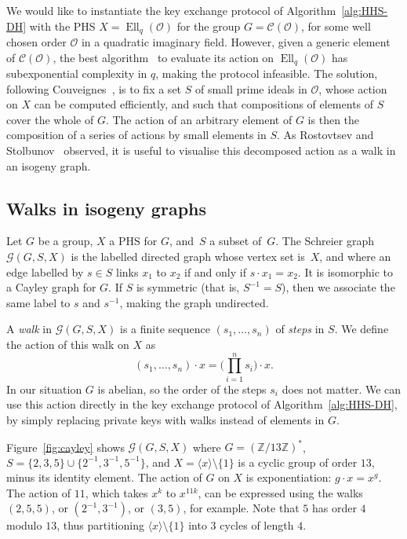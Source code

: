 \documentclass{llncs}
\newcommand{\Cl}{\mathcal{C}}
\newcommand{\Graph}{\mathcal{G}}
\renewcommand{\O}{\mathcal{O}}
\DeclareMathOperator{\Ell}{Ell}
\begin{document}
We would like to instantiate the key exchange protocol of
Algorithm~\ref{alg:HHS-DH} with the PHS
$X = \Ell_q(\O)$ for the group $G = \Cl(\O)$, 
for some well chosen order $\O$ in a quadratic imaginary field. 
However, given a generic element of $\Cl(\O)$, 
the best algorithm~\cite{jao+soukharev10} to evaluate
its action on $\Ell_q(\O)$ has subexponential complexity in $q$,
making the protocol infeasible. 
The solution,
following Couveignes~\cite{cryptoeprint:2006:291},
is to fix a set $S$ of small prime ideals in $\O$,
whose action on $X$ can be computed efficiently,
and such that compositions of elements of $S$
cover the whole of $G$.
The action of an arbitrary element of $G$
is then the composition of a series of actions by small elements in $S$.
As Rostovtsev and Stolbunov~\cite{rostovtsev+stolbunov06} observed,
it is useful to visualise this decomposed action
as a walk in an isogeny graph.


\subsection{Walks in isogeny graphs}

Let $G$ be a group,
$X$ a PHS for $G$,
and~$S$ a subset of~$G$.
The Schreier graph $\Graph(G,S,X)$
is the labelled directed graph whose vertex set is~$X$, 
and where an edge labelled by $s∈S$
links $x_1$ to $x_2$ if and only if $s\cdot x_1 = x_2$.
It is isomorphic to a Cayley graph for $G$.
If $S$ is symmetric (that is, $S^{-1}=S$), 
then we associate the same label to $s$ and $s^{-1}$, 
making the graph undirected.

A \emph{walk} in $\Graph(G,S,X)$ is a finite sequence
$(s_1,\ldots,s_n)$ of \emph{steps} in $S$. 
We define the action of this walk on $X$ as
\[
    (s_1,\ldots,s_n)·x 
    = 
    \big(\prod_{i=1}^n s_i\big)·x.
\]
In our situation $G$ is abelian,
so the order of the steps $s_i$ does not matter.
We can use this action directly in the key exchange protocol
of Algorithm~\ref{alg:HHS-DH},
by simply replacing private keys with walks instead of elements in $G$.

\begin{example}
Figure~\ref{fig:cayley}
shows $\Graph(G,S,X)$ where $G=(ℤ/13ℤ)^*$, 
$S = \{2,3,5\}\cup\{2^{-1},3^{-1},5^{-1}\}$,
and $X = \langle{x}\rangle\setminus\{1\}$ 
is a cyclic group of order $13$, minus its identity element.
The action of $G$ on $X$ is exponentiation: $g·x=x^g$.
The action of $11$, which takes $x^k$ to $x^{11k}$,
can be expressed using the walks 
$(2,5,5)$,
or $(2^{-1},3^{-1})$,
or $(3,5)$,
for example.  Note that $5$ has order $4$ modulo
$13$, thus partitioning $〈x〉\setminus\{1\}$ into $3$ cycles of
length $4$.
\end{example}
\end{document}
